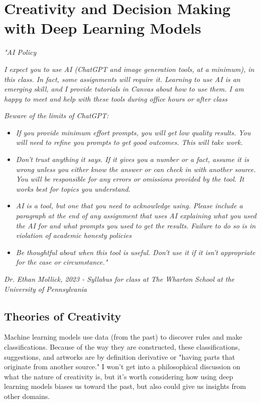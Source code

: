 
\chapter{Creativity and Decision Making with Deep Learning Models}

\textit{"AI Policy}

\textit{I expect you to use AI (ChatGPT and image generation tools, at a minimum), in this class. In fact, some assignments will require it. Learning to use AI is an emerging skill, and I provide tutorials in Canvas about how to use them. I am happy to meet and help with these tools during office hours or after class}

\textit{Beware of the limits of ChatGPT:}

\begin{itemize}
	\item\textit{If you provide minimum effort prompts, you will get low quality results. You will need to refine you prompts to get good outcomes. This will take work.}
	\item\textit{Don't trust anything it says. If it gives you a number or a fact, assume it is wrong unless you either know the answer or can check in with another source. You will be responsible for any errors or omissions provided by the tool. It works best for topics you understand.}
	\item\textit{AI is a tool, but one that you need to acknowledge using. Please include a paragraph at the end of any assignment that uses AI explaining what you used the AI for and what prompts you used to get the results. Failure to do so is in violation of academic honesty policies}
	\item\textit{Be thoughtful about when this tool is useful. Don't use it if it isn't appropriate for the case or circumstance."}
\end{itemize}

\textit{Dr. Ethan Mollick, 2023 - Syllabus for class at The Wharton School at the University of Pennsylvania}


\section{Theories of Creativity}

Machine learning models use data (from the past) to discover rules and make classifications. Because of the way they are constructed, these classifications, suggestions, and artworks are by definition derivative or "having parts that originate from another source." I won't get into a philosophical discussion on what the nature of creativity is, but it's worth considering how using deep learning models biases us toward the past, but also could give us insights from other domains.

